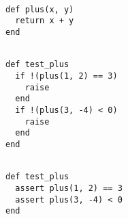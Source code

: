 \begin{lstlisting}[caption=An example function.,
                   label=lst:basic_function, float=t]

def plus(x, y)
  return x + y
end

\end{lstlisting}


\begin{lstlisting}[caption=A piece of code that could be used for testing the function in code listing \ref{lst:basic_function}.,
                   label=lst:dummy_test, float=t]

def test_plus
  if !(plus(1, 2) == 3)
    raise
  end
  if !(plus(3, -4) < 0)
    raise
  end
end

\end{lstlisting}

\begin{lstlisting}[caption=A basic test for the function in code listing \ref{lst:basic_function}.,
                   label=lst:basic_test, float=t]

def test_plus
  assert plus(1, 2) == 3
  assert plus(3, -4) < 0
end

\end{lstlisting}
